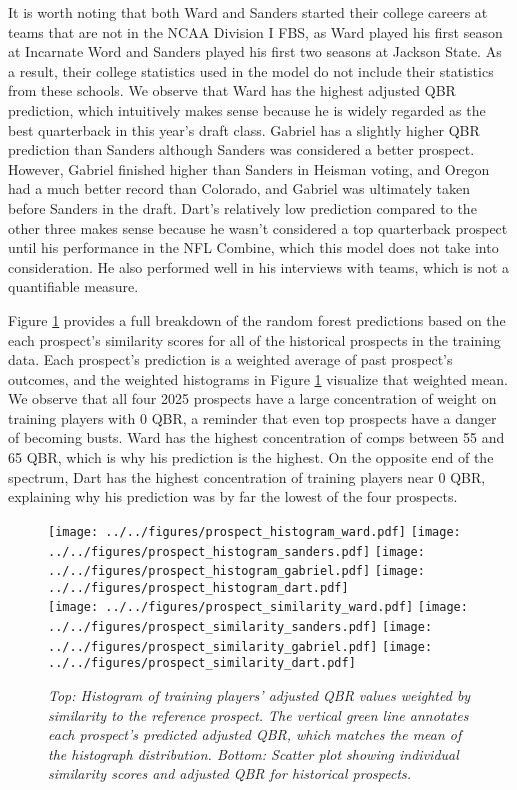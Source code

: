 \documentclass{article}
\begin{document}
It is worth noting that both Ward and Sanders started their college careers at teams that are not in the NCAA Division I FBS, as Ward played his first season at Incarnate Word and Sanders played his first two seasons at Jackson State. As a result, their college statistics used in the model do not include their statistics from these schools. We observe that Ward has the highest adjusted QBR prediction, which intuitively makes sense because he is widely regarded as the best quarterback in this year's draft class. Gabriel has a slightly higher QBR prediction than Sanders although Sanders was considered a better prospect. However, Gabriel finished higher than Sanders in Heisman voting, and Oregon had a much better record than Colorado, and Gabriel was ultimately taken before Sanders in the draft. Dart's relatively low prediction compared to the other three makes sense because he wasn't considered a top quarterback prospect until his performance in the NFL Combine, which this model does not take into consideration. He also performed well in his interviews with teams, which is not a quantifiable measure.

Figure \ref{fig:prospect-plots} provides a full breakdown of the random forest predictions based on the each prospect's similarity scores for all of the historical prospects in the training data. Each prospect's prediction is a weighted average of past prospect's outcomes, and the weighted histograms in Figure \ref{fig:prospect-plots} visualize that weighted mean. We observe that all four 2025 prospects have a large concentration of weight on training players with 0 QBR, a reminder that even top prospects have a danger of becoming busts. Ward has the highest concentration of comps between 55 and 65 QBR, which is why his prediction is the highest. On the opposite end of the spectrum, Dart has the highest concentration of training players near 0 QBR, explaining why his prediction was by far the lowest of the four prospects.

\begin{figure}[H]
    \centering
    \texttt{[image: ../../figures/prospect\_histogram\_ward.pdf]}
    \texttt{[image: ../../figures/prospect\_histogram\_sanders.pdf]}
    \texttt{[image: ../../figures/prospect\_histogram\_gabriel.pdf]}
    \texttt{[image: ../../figures/prospect\_histogram\_dart.pdf]} \\
    \texttt{[image: ../../figures/prospect\_similarity\_ward.pdf]}
    \texttt{[image: ../../figures/prospect\_similarity\_sanders.pdf]}
    \texttt{[image: ../../figures/prospect\_similarity\_gabriel.pdf]}
    \texttt{[image: ../../figures/prospect\_similarity\_dart.pdf]}
    \caption{\textit{Top: Histogram of training players' adjusted QBR values weighted by similarity to the reference prospect. The vertical green line annotates each prospect's predicted adjusted QBR, which matches the mean of the histograph distribution. Bottom: Scatter plot showing individual similarity scores and adjusted QBR for historical prospects.}}
    \label{fig:prospect-plots}
\end{figure}
\end{document}
